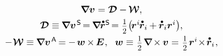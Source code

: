 \nopagebreak\vspace{-0.1em}\begin{equation}
\begin{array}{c}
\boldnabla \bm{v} = \rateofdeformationtensor - \hspace{-0.1ex} \vorticitytensor
,
\\[.333em]
%
\rateofdeformationtensor \equiv \hspace{-0.12ex} \boldnabla {\bm{v}}^{\hspace{.2ex}\mathsf{S}} \hspace{-0.32ex}
=  \hspace{-0.2ex} \boldnabla \hspace{-0.16ex} \mathdotabove{\currentlocationvector}^{\mathsf{S}} \hspace{-0.32ex}
= \smalldisplaystyleonehalf \hspace{-0.33ex} \left( \hspace{-0.3ex} \currentlocationvector^{i} \hspace{-0.2ex} \mathdotabove{\currentlocationvector}_i \hspace{-0.1ex} + \hspace{-0.1ex} \mathdotabove{\currentlocationvector}_i \currentlocationvector^{i} \right)
\hspace{-0.44ex} ,
\\[.44em]
%
- \hspace{.1ex} \vorticitytensor \equiv \hspace{-0.12ex} \boldnabla {\bm{v}}^{\hspace{.2ex}\mathsf{A}} \hspace{-0.25ex}
= \hspace{-0.1ex} - \hspace{.24ex} \vorticityvector \hspace{-0.12ex} \times \hspace{-0.2ex} \UnitDyad
\hspace{.1ex} , \hspace{.6em}
\vorticityvector \equiv \hspace{.1ex} \smalldisplaystyleonehalf \hspace{.15ex} \boldnabla \hspace{-0.2ex} \times \hspace{-0.1ex} \bm{v}
= \hspace{.1ex} \smalldisplaystyleonehalf \hspace{.15ex} \currentlocationvector^{i} \hspace{-0.4ex}\times\hspace{-0.35ex} \mathdotabove{\currentlocationvector}_i
\hspace{.1ex} ,
\end{array}
\end{equation}

